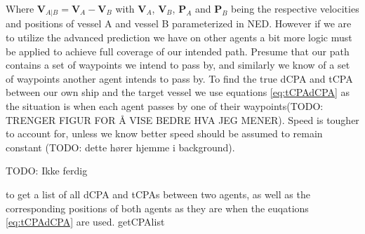 Where $\textbf{V}_{A|B} = \textbf{V}_A - \textbf{V}_B$ with $\textbf{V}_A$, $\textbf{V}_B$, $\textbf{P}_A$ and $\textbf{P}_B$ being the respective
velocities and positions of vessel A and vessel B parameterized in NED. However if we are to utilize the advanced prediction we have on other agents a bit more logic must be applied
to achieve full coverage of our intended path. Presume that our path contains a set of waypoints we intend to pass by, and similarly we know of a set of waypoints another agent intends to
pass by. To find the true dCPA and tCPA between our own ship and the target vessel we use equations \ref{eq:tCPAdCPA} as the situation is when each agent passes by one of their
waypoints(TODO: TRENGER FIGUR FOR Å VISE BEDRE HVA JEG MENER).  Speed is tougher to account for, unless we know better speed should be assumed to remain constant (TODO: dette hører hjemme i background).



TODO: Ikke ferdig


to get a list of all dCPA and tCPAs between two agents, as well as the corresponding positions of both
agents as they are when the euqations \ref{eq:tCPAdCPA} are used. getCPAlist 

